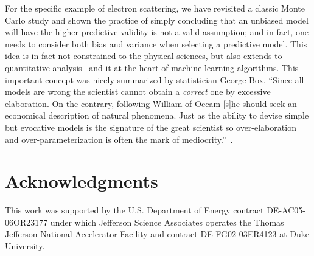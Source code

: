 \documentclass[10pt,aps,prc,twocolumn]{revtex4-1}
\begin{document}
For the specific example of electron scattering, we have revisited a classic Monte Carlo study and shown
the practice of simply concluding that an unbiased model will have the higher predictive validity 
is not a valid assumption; and in fact, one needs to consider both bias and variance when selecting
a predictive model.   This idea is in fact not constrained to the physical sciences, but also extends 
to quantitative analysis~\cite{Brighton:2015} and it at the heart of machine learning algorithms.
This important concept was nicely summarized by statistician George Box, ``Since all models 
are wrong the scientist cannot obtain a {\it{correct}} one
by excessive elaboration.  On the contrary, following William of Occam [s]he should seek an
economical description of natural phenomena. Just as the ability to devise simple 
but evocative models is the signature of the
great scientist so over-elaboration and over-parameterization is often
the mark of mediocrity.''~\cite{Box76}.


\section{Acknowledgments}

This work was supported by the U.S.  Department of Energy contract DE-AC05-06OR23177
under which Jefferson Science Associates operates the Thomas Jefferson National 
Accelerator Facility and contract DE-FG02-03ER4123 at Duke University.


\end{document}
